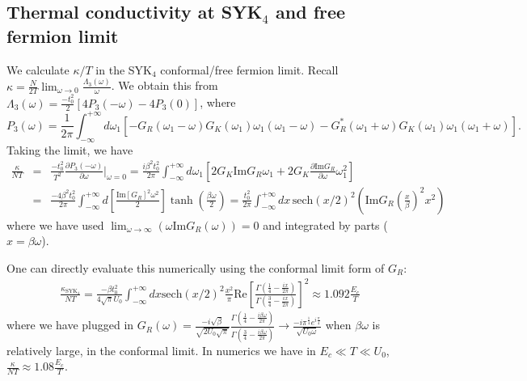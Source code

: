 \documentclass[twocolumn,floatfix,superscriptaddress]{revtex4-1}
\newcommand{\pkpr}{P_3}
\begin{document}
\begin{widetext}
\subsection{Thermal conductivity at SYK$_4$ and free fermion limit}
  We calculate $\kappa/T$ in the SYK$_4$ conformal/free fermion
  limit. Recall $\kappa = \frac{N}{2T}\lim_{\omega\rightarrow 0}
  \frac{\Lambda_3(\omega)}{\omega}$.  We obtain this from
  $\Lambda_3(\omega)=\frac{-t_0^2}{2}[4\pkpr(-\omega)-4\pkpr(0)]$,
  where 
  \begin{equation}
    \label{eq:1}
    P_3(\omega)= \frac{1}{2\pi}\int_{-\infty}^{+\infty} d\omega_1[-G_R(\omega_1-\omega)G_K(\omega_1) \omega_1(\omega_1-\omega)-G_R^*(\omega_1+\omega)G_K(\omega_1)\omega_1(\omega_1+\omega)].
  \end{equation}
Taking the limit, we have
 \begin{eqnarray}
 \label{kappaex}
\frac{\kappa}{NT}&=&\frac{-t_0^2}{T^2}\frac{\partial P_3(-\omega)}{\partial \omega}\Big |_{\omega=0}=\frac{i\beta^2 t_0^2}{2\pi}\int _{-\infty}^{+\infty}d\omega_1 [2G_K\text{Im}G_R \omega_1+2G_K\frac{\partial\text{Im} G_R}{\partial \omega} \omega_1^2]\nonumber\\
&=&\frac{-4\beta^2 t_0^2}{2\pi}\int_{-\infty}^{+\infty} d[\frac{\text{Im}[G_R]^2\omega^2}{2}] \tanh(\frac{\beta\omega}{2})=\frac{t_0^2}{2\pi}\int_{-\infty}^{+\infty} \! dx\, \text{sech} (x/2)^2 (\text{Im}G_R(\frac{x}{\beta})^2 x^2)
 \end{eqnarray}
where we have used $\lim_{\omega\rightarrow \infty} (\omega\text{Im}G_R(\omega)) = 0$ and integrated by parts ($x=\beta\omega$).

 One can directly evaluate this numerically using the conformal limit form of $G_R$:
 \begin{eqnarray}
 \label{kappa_cf}
 \frac{\kappa_{\text{SYK}_4}}{NT}
 =\frac{-\beta t_0^2}{4\sqrt \pi U_0}\int_{-\infty}^{+\infty}  dx \text{sech}(x/2)^2 \frac{x^2}{\pi}\text{Re}[\frac{\Gamma(\frac{1}{4}-\frac{ix}{2\pi})}{\Gamma(\frac{3}{4}-\frac{ix}{2\pi})}]^2\approx 1.092\frac{E_c}{T}
 \end{eqnarray}
where we have plugged in $G_R(\omega)=\frac{-i\sqrt{\beta}}{\sqrt{2U_0\sqrt{\pi}}}\frac{\Gamma(\frac{1}{4}-\frac{i\beta\omega}{2\pi})}{\Gamma(\frac{3}{4}-\frac{i\beta\omega}{2\pi})}\rightarrow\frac{-i \pi^{\frac{1}{4}} e^{i\frac{\pi}{4}}}{\sqrt {U_0\omega}}$ when $\beta\omega$ is relatively large, in the conformal limit. In numerics we have in $E_c\ll T\ll U_0$, $\frac{\kappa}{NT}\approx 1.08\frac{E_c}{T}$. 


\end{widetext}
\end{document}
